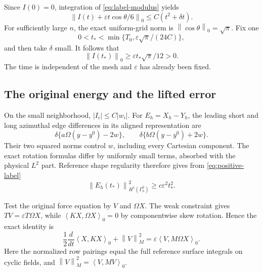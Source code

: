 \documentclass[11pt,a4paper]{article}
\numberwithin{equation}{section}
\theoremstyle{remark}
\newcommand{\norm}[1]{\left\lVert #1\right\rVert}
\newcommand{\ip}[2]{\left\langle #1,#2\right\rangle_0}
\begin{document}
Since \(I(0)=0\), integration of \eqref{eq:label-modulus} yields
\begin{equation}\label{eq:label-growth}
 \norm{I(t)+\varepsilon t\cos\theta/6}_0
                                    \leq C(t^2+\delta t).
\end{equation}
For sufficiently large \(n\), the exact uniform-grid norm is
\(\norm{\cos\theta}_0=\sqrt\pi\). Fix one
\[
        0<t_*<\min\{T_0,\varepsilon\sqrt\pi/(24C)\},
\]
and then take \(\delta\) small. It follows that
\begin{equation}\label{eq:positive-label}
                   \norm{I(t_*)}_0\geq
                           \varepsilon t_*\sqrt\pi/12>0 .
\end{equation}
The time is independent of the mesh and \(\varepsilon\) has already
been fixed.

\subsection{The original energy and the lifted error}

On the small neighborhood, \(|I_i|\leq C|w_i|\).
For \(E_h=X_h-Y_h\), the leading short and long azimuthal edge
differences in its aligned representation are
\[
 \delta\{a\Omega(y-y^0)-2w\},\qquad
 \delta\{b\Omega(y-y^0)+2w\}.
\]
Their two squared norms control \(w\), including every Cartesian
component. The exact rotation formulas differ by uniformly small
terms, absorbed with the physical \(L^2\) part. Reference shape
regularity therefore gives from \eqref{eq:positive-label}
\begin{equation}\label{eq:positive-H1}
             \norm{E_h(t_*)}_{H^1(\Gamma_h^0)}^2
                                      \geq c\varepsilon^2t_*^2 .
\end{equation}

Test the original force equation by \(V\) and \(\Omega X\).
The weak constraint gives \(TV=\varepsilon T\Omega X\), while
\(\ip{KX}{\Omega X}=0\) by componentwise skew rotation. Hence
the exact identity is
\begin{equation}\label{eq:original-energy}
 \frac12\frac d{dt}\ip X{KX}+\norm V_M^2
                                =\varepsilon\ip V{M\Omega X}.
\end{equation}
Here the normalized row pairings equal the full reference surface
integrals on cyclic fields, and \(\norm V_M^2=\ip V{MV}\).
\end{document}
